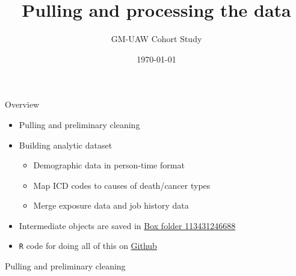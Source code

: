 \documentclass[
  ignorenonframetext,
  aspectratio=169,
]{beamer}
\title{Pulling and processing the data}
\subtitle{GM-UAW Cohort Study}
\author{}
\date{\vspace{-2.5em}\today}
\providecommand{\tightlist}{%
  \setlength{\itemsep}{0pt}\setlength{\parskip}{0pt}}
\begin{document}
\frame{\titlepage}

\begin{frame}[fragile]{Overview}
\protect\hypertarget{overview}{}

\begin{itemize}
\tightlist
\item
  Pulling and preliminary cleaning
\item
  Building analytic dataset

  \begin{itemize}
  \tightlist
  \item
    Demographic data in person-time format
  \item
    Map ICD codes to causes of death/cancer types
  \item
    Merge exposure data and job history data
  \end{itemize}
\item
  Intermediate objects are saved in
  \href{https://berkeley.app.box.com/folder/113431246688}{Box folder
  113431246688}
\item
  \texttt{R} code for doing all of this on
  \href{https://github.com/tao-feng/gm-wrangling.git}{Github}
\end{itemize}

\end{frame}

\begin{frame}{Pulling and preliminary cleaning}
\protect\hypertarget{pulling-and-preliminary-cleaning}{}

\begin{minipage}{\linewidth}
    \centering
    \begin{adjustbox}{scale = 0.7}
    
    \end{adjustbox}
\end{minipage}\vspace{1em}
\begin{minipage}{\linewidth}
    \centering
    \begin{adjustbox}{scale = 0.7}
    
    \end{adjustbox}
\end{minipage}

\end{frame}

\begin{frame}{}
\protect\hypertarget{section}{}

\begin{center}
    \begin{adjustbox}{scale = 0.7}
    
    \end{adjustbox}
\end{center}

\end{frame}
\end{document}
